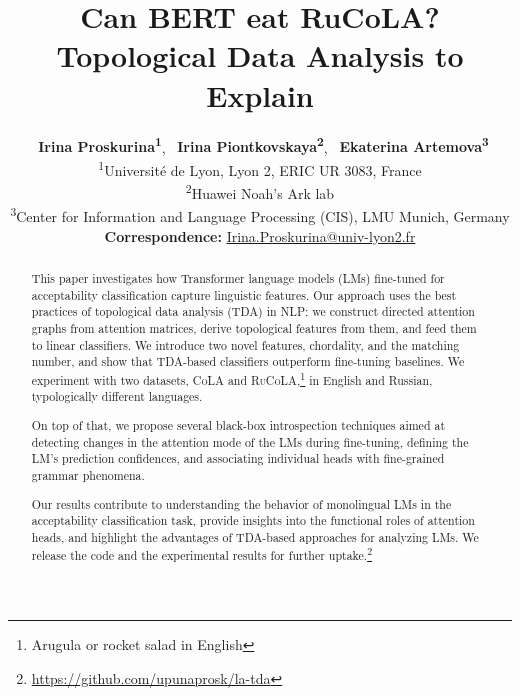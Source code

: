 \documentclass[11pt]{article}
\title{Can BERT eat RuCoLA? Topological Data Analysis to Explain}
\author{
    ~\textbf{Irina Proskurina\textsuperscript{1}}, 
    ~\textbf{Irina Piontkovskaya\textsuperscript{2}},
    ~\textbf{Ekaterina Artemova\textsuperscript{3}} \\
    \textsuperscript{1}Universit{\'e} de Lyon, Lyon 2, ERIC UR 3083, France\\ 
    \textsuperscript{2}Huawei Noah’s Ark lab \\
    \textsuperscript{3}Center for Information and Language Processing (CIS), LMU Munich, Germany \\
    \textbf{Correspondence:} \href{mailto:Irina.Proskurina@univ-lyon2.fr}{Irina.Proskurina@univ-lyon2.fr}
}
\begin{document}
\maketitle
\begin{abstract}
This paper investigates how Transformer language models (LMs) fine-tuned for acceptability classification capture linguistic features. Our approach uses the best practices of topological data analysis (TDA) in NLP: we construct directed attention graphs from attention matrices, derive topological features from them, and feed them to linear classifiers. We introduce two novel features, chordality, and the matching number, and show that TDA-based classifiers outperform fine-tuning baselines. We experiment with two datasets, \textsc{CoLA} and \textsc{RuCoLA},\footnote{Arugula or rocket salad in English} in English and Russian, typologically different languages. 

On top of that, we propose several black-box introspection techniques aimed at detecting changes in the attention mode of the LMs during fine-tuning, defining the LM's prediction confidences, and associating individual heads with fine-grained grammar phenomena. 

Our results contribute to understanding the behavior of monolingual LMs in the acceptability classification task, provide insights into the functional roles of attention heads, and highlight the advantages of TDA-based approaches for analyzing LMs.
We release the code and the experimental results for further uptake.\footnote{\href{https://github.com/upunaprosk/la-tda}{https://github.com/upunaprosk/la-tda}}


\end{abstract}
\end{document}
